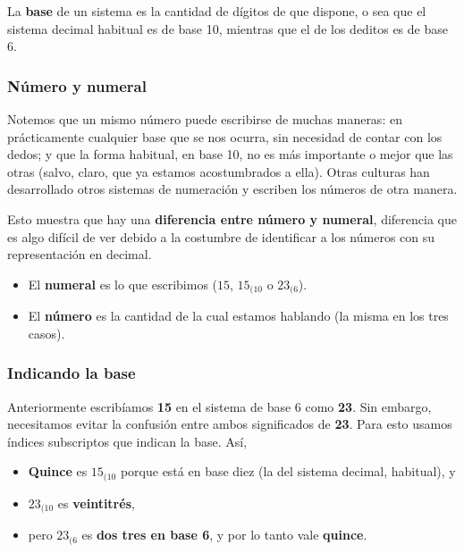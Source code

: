 \documentclass[spanish,A4,]{article}
\begin{document}
La \textbf{base} de un sistema es la cantidad de dígitos de que dispone,
o sea que el sistema decimal habitual es de base 10, mientras que el de
los deditos es de base 6.

\subsubsection{Número y numeral}\label{nuxfamero-y-numeral}

Notemos que un mismo número puede escribirse de muchas maneras: en
prácticamente cualquier base que se nos ocurra, sin necesidad de contar
con los dedos; y que la forma habitual, en base 10, no es más importante
o mejor que las otras (salvo, claro, que ya estamos acostumbrados a
ella). Otras culturas han desarrollado otros sistemas de numeración y
escriben los números de otra manera.

Esto muestra que hay una \textbf{diferencia entre número y numeral},
diferencia que es algo difícil de ver debido a la costumbre de
identificar a los números con su representación en decimal.

\begin{itemize}
\itemsep1pt\parskip0pt
\item
  El \textbf{numeral} es lo que escribimos ($15$, \textbf{$15_{(10}$} o
  \textbf{$23_{(6}$}).
\item
  El \textbf{número} es la cantidad de la cual estamos hablando (la
  misma en los tres casos).
\end{itemize}

\subsubsection{Indicando la base}\label{indicando-la-base}

Anteriormente escribíamos \textbf{15} en el sistema de base 6 como
\textbf{23}. Sin embargo, necesitamos evitar la confusión entre ambos
significados de \textbf{23}. Para esto usamos índices subscriptos que
indican la base. Así,

\begin{itemize}
\itemsep1pt\parskip0pt
\item
  \textbf{Quince} es \textbf{$15_{(10}$} porque está en base diez (la
  del sistema decimal, habitual), y
\item
  \textbf{$23_{(10}$} es \textbf{veintitrés},
\item
  pero \textbf{$23_{(6}$} es \textbf{dos tres en base 6}, y por lo tanto
  vale \textbf{quince}.
\end{itemize}
\end{document}
